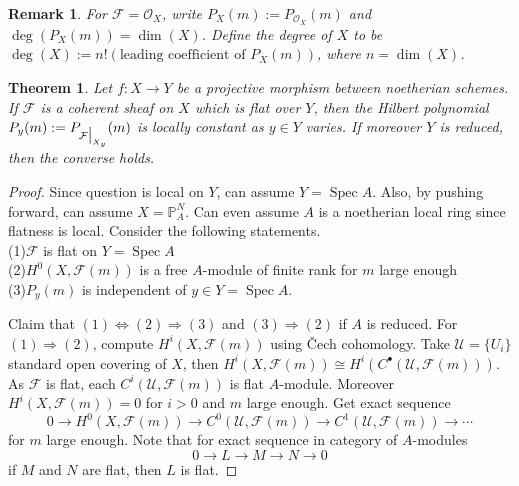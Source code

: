\documentclass{ctexart}
\newtheorem{remark}{Remark}[section]
\newtheorem{theorem}{Theorem}[section]
\newcommand{\spec}{\operatorname{Spec}}
\begin{document}
\begin{remark}
    For $\mathcal{F} = \mathcal{O}_{X}$, write $P_{X}(m) := P_{\mathcal{O}_{X}}(m)$ and $\deg(P_{X}(m)) = \dim(X)$.
    Define the degree of $X$ to be $\deg(X) := n!(\text{leading coefficient of } P_{X}(m))$, where $n = \dim(X)$.
\end{remark}
\begin{theorem}
    Let $f: X \longrightarrow Y$ be a projective morphism between noetherian schemes.
    If $\mathcal{F}$ is a coherent sheaf on $X$ which is flat over $Y$, then the Hilbert polynomial $P_{y}(m) := P_{\mathcal{F}\big{|}_{X_{y}}}(m)$ is locally constant as $y\in Y$ varies.
    If moreover $Y$ is reduced, then the converse holds.
    \label{Theorem 12.1}
\end{theorem}
\begin{proof}
    Since question is local on $Y$, can assume $Y = \spec A$.
    Also, by pushing forward, can assume $X = \mathbb{P}_{A}^{N}$.
    Can even assume $A$ is a noetherian local ring since flatness is local.
    Consider the following statements. \\
    (1)$\mathcal{F}$ is flat on $Y = \spec A$ \\
    (2)$H^{0}(X, \mathcal{F}(m))$ is a free $A$-module of finite rank for $m$ large enough \\
    (3)$P_{y}(m)$ is independent of $y\in Y = \spec A$.
    \par
    Claim that $(1) \iff (2) \Rightarrow (3)$ and $(3) \Rightarrow (2)$ if $A$ is reduced.
    For $(1) \Rightarrow (2)$, compute $H^{i}(X, \mathcal{F}(m))$ using Čech cohomology.
    Take $\mathcal{U} = \{U_{i}\}$ standard open covering of $X$, then $H^{i}(X, \mathcal{F}(m)) \cong H^{i}(C^{\bullet}(\mathcal{U}, \mathcal{F}(m)))$.
    As $\mathcal{F}$ is flat, each $C^{i}(\mathcal{U}, \mathcal{F}(m))$ is flat $A$-module.
    Moreover $H^{i}(X, \mathcal{F}(m)) = 0$ for $i > 0$ and $m$ large enough.
    Get exact sequence
    \begin{equation*}
        0 \longrightarrow H^{0}(X, \mathcal{F}(m)) \longrightarrow C^{0}(\mathcal{U}, \mathcal{F}(m)) \longrightarrow C^{1}(\mathcal{U}, \mathcal{F}(m)) \longrightarrow \cdots
    \end{equation*}
    for $m$ large enough.
    Note that for exact sequence in category of $A$-modules 
    \begin{equation*}
        0 \longrightarrow L \longrightarrow M \longrightarrow N \longrightarrow 0
    \end{equation*}
    if $M$ and $N$ are flat, then $L$ is flat.

\end{proof}
\end{document}
